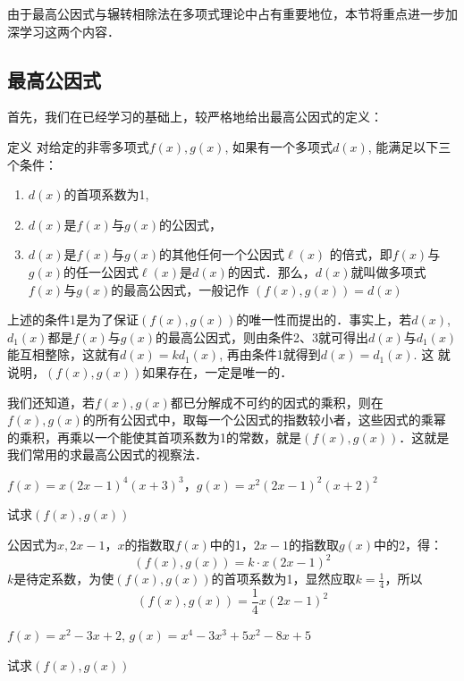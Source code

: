 由于最高公因式与辗转相除法在多项式理论中占有重要地位，本节将重点进一步加深学习这两个内容．

\subsection{最高公因式}

首先，我们在已经学习的基础上，较严格地给出最高公因式的定义：

\begin{blk}{定义}
 对给定的非零多项式$f(x),g(x)$, 如果有一个多项式$d(x)$, 能满足以下三个条件：   
\begin{enumerate}
    \item $d(x)$的首项系数为1,
    \item $d(x)$是$f(x)$与$g(x)$的公因式，
    \item $d(x)$是$f(x)$与$g(x)$的其他任何一个公因式$\ell(x)$
    的倍式，即$f(x)$与$g(x)$的任一公因式$\ell(x)$是$d(x)$的因式．那么，$d(x)$就叫做多项式$f(x)$与$g(x)$的最高公因式，一般记作
    $(f (x) ,g (x) ) =d (x)$
\end{enumerate}
\end{blk}

上述的条件1是为了保证$(f(x),g(x))$的唯一性而提出的．事实上，若$d(x)$, $d_1(x)$都是$f(x)$与$g(x)$的最高公因式，则由条件2、3就可得出$d(x)$与$d_1(x)$能互相整除，这就有$d(x)=kd_1(x)$, 再由条件1就得到$d(x)=d_1(x)$. 这
就说明，$(f(x),g(x))$如果存在，一定是唯一的．

我们还知道，若$f(x),g(x)$都已分解成不可约的因式的乘积，则在$f(x),g(x)$的所有公因式中，取每一个公因式的指数较小者，这些因式的乘幂的乘积，再乘以一个能使其首项系数为1的常数，就是$(f(x),g(x))$．这就是我们常用的求最高公因式的视察法．


\begin{example}
$f(x)=x(2x-1)^4(x+3)^3$，$g(x)=x^2(2x-1)^2(x+2)^2$

试求$(f(x),g(x))$
\end{example}

\begin{solution}
    公因式为$x,2x-1$，$x$的指数取$f(x)$中的1，$2x-1$的指数取$g(x)$中的2，得：
\[(f(x),g(x))=k\cdot x (2x-1)^2\]
$k$是待定系数，为使$(f(x),g(x))$的首项系数为1，显然应取$k=\frac{1}{4}$，所以
\[(f(x),g(x))=\frac{1}{4}  x (2x-1)^2\]
\end{solution}

\begin{example}
$f(x)=x^2-3x+2$, $g(x)=x^4-3x^3+5x^2-8x+5$

试求$(f(x),g(x))$
\end{example}

